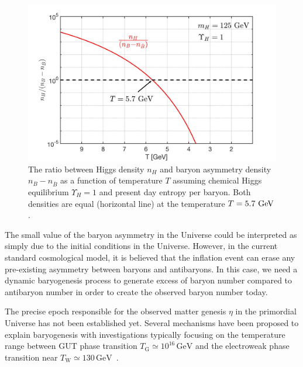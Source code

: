 \begin{figure}
\centerline{\includegraphics[width=0.9\linewidth]{./plots/HiggsDensityRatio}}
\caption{The ratio between Higgs density $n_H$ and baryon asymmetry density $n_B-n_{\bar B}$ as a function of temperature $T$ assuming chemical Higgs equilibrium $\Upsilon_H=1$ and present day entropy per baryon. Both densities are equal (horizontal line) at the temperature $T=5.7\text{ GeV}$. }
\label{HiggsDensity:fig} 
\end{figure}

The small value of the baryon asymmetry in the Universe could be interpreted as simply due to the initial conditions in the Universe. However, in the current standard cosmological model, it is believed that the inflation event can erase any pre-existing asymmetry between baryons and antibaryons. In this case, we need a dynamic baryogenesis process to generate excess of baryon number compared to antibaryon number in order to create the observed baryon number today.

The precise epoch responsible for the observed matter genesis $\eta$ in the primordial Universe has not been established yet. Several mechanisms have been proposed to explain baryogenesis with investigations typically focusing on the temperature range between GUT phase transition $T_\mathrm{G}\simeq10^{16}\,\mathrm{GeV}$ and the electroweak phase transition near $T_\mathrm{W}\simeq130\,\mathrm{GeV}$~\cite{Kuzmin:1985mm,Kuzmin:1987wn,Arnold:1987mh,Kolb:1996jt,Riotto:1999yt,Nielsen:2001fy,Giudice:2003jh,Davidson:2008bu,Morrissey:2012db}.

